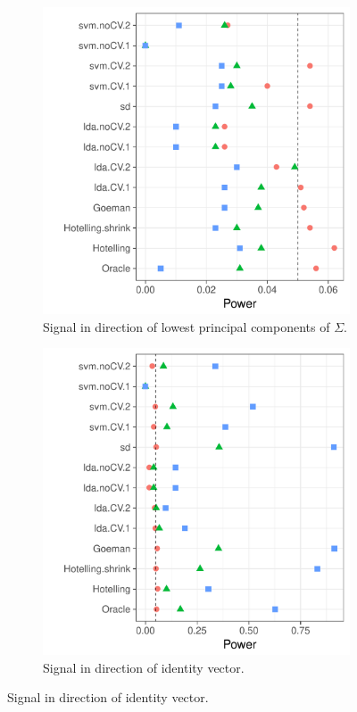 \documentclass[12pt,a4paper]{article}
\begin{document}
\begin{figure}[h]
\begin{subfigure}[t]{.3\textwidth}
		\includegraphics[width=1\linewidth]{"art/file21"}
		\caption{Signal in direction of lowest principal components of $\Sigma$.} 
		\label{fig:dependence_12}
	\end{subfigure}
	\begin{subfigure}[t]{.3\textwidth}
		\centering
		  \includegraphics[width=1\linewidth]{"art/file11"}
		\caption{Signal in direction of identity vector.} 
		\label{fig:dependence_13}
	\end{subfigure}
\end{figure}
\end{document}

